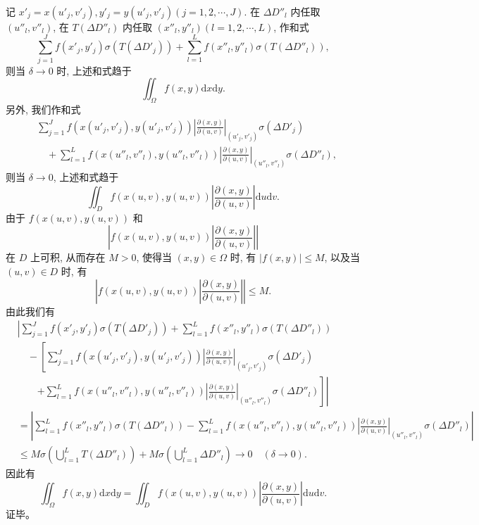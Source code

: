 \documentclass[UTF8, 12pt, fontset=fandol, oneside]{ctexart}
\begin{document}
记 $x'_j=x(u'_j,v'_j), y'_j=y(u'_j,v'_j)(j=1,2,\cdots,J)$. 在 $\Delta D''_l$ 内任取 $(u''_l,v''_l)$, 在 $T(\Delta D''_l)$ 内任取 $(x''_l,y''_l)(l=1,2,\cdots,L)$, 作和式
\begin{equation}
  \sum_{j=1}^J f(x'_j,y'_j)\sigma(T(\Delta D'_j))
  +\sum_{l=1}^L f(x''_l,y''_l)\sigma(T(\Delta D''_l)),
  \tag{15.4.1}
\end{equation}
则当 $\delta\to0$ 时, 上述和式趋于
\[
  \iint_\Omega f(x,y)\mathrm dx\mathrm dy.
\]
另外, 我们作和式
\begin{equation}
\begin{aligned}
  &\sum_{j=1}^J f(x(u'_j,v'_j),y(u'_j,v'_j))
  \left|\frac{\partial(x,y)}{\partial(u,v)}\right|_{(u'_j,v'_j)}
  \sigma(\Delta D'_j)\\
  &\quad+\sum_{l=1}^L f(x(u''_l,v''_l),y(u''_l,v''_l))
  \left|\frac{\partial(x,y)}{\partial(u,v)}\right|_{(u''_l,v''_l)}
  \sigma(\Delta D''_l),
\end{aligned}
  \tag{15.4.2}
\end{equation}
则当 $\delta\to0$, 上述和式趋于
\[
  \iint_D f(x(u,v),y(u,v))
  \left|\frac{\partial(x,y)}{\partial(u,v)}\right|\mathrm du\mathrm dv.
\]
由于 $f(x(u,v),y(u,v))$ 和
\[
  \left|f(x(u,v),y(u,v))\left|\frac{\partial(x,y)}{\partial(u,v)}\right|\right|
\]
在 $D$ 上可积, 从而存在 $M>0$, 使得当 $(x,y)\in\Omega$ 时, 有 $|f(x,y)|\leqslant M$, 以及当 $(u,v)\in D$ 时, 有
\[
  \left|f(x(u,v),y(u,v))\left|\frac{\partial(x,y)}{\partial(u,v)}\right|\right|\leqslant M.
\]
由此我们有
\[
\begin{aligned}
  &\left|
  \sum_{j=1}^J f(x'_j,y'_j)\sigma(T(\Delta D'_j))
  +\sum_{l=1}^L f(x''_l,y''_l)\sigma(T(\Delta D''_l))\right.\\
  &\quad-\left[
  \sum_{j=1}^J f(x(u'_j,v'_j),y(u'_j,v'_j))
  \left|\frac{\partial(x,y)}{\partial(u,v)}\right|_{(u'_j,v'_j)}
  \sigma(\Delta D'_j)\right.\\
  &\qquad\left.\left.
  +\sum_{l=1}^L f(x(u''_l,v''_l),y(u''_l,v''_l))
  \left|\frac{\partial(x,y)}{\partial(u,v)}\right|_{(u''_l,v''_l)}
  \sigma(\Delta D''_l)\right]\right|\\
  &=\left|
  \sum_{l=1}^L f(x''_l,y''_l)\sigma(T(\Delta D''_l))
  -\sum_{l=1}^L f(x(u''_l,v''_l),y(u''_l,v''_l))
  \left|\frac{\partial(x,y)}{\partial(u,v)}\right|_{(u''_l,v''_l)}
  \sigma(\Delta D''_l)\right|\\
  &\leqslant M\sigma\left(\bigcup_{l=1}^L T(\Delta D''_l)\right)
  +M\sigma\left(\bigcup_{l=1}^L\Delta D''_l\right)\to0\quad(\delta\to0).
\end{aligned}
\]
因此有
\[
  \iint_\Omega f(x,y)\mathrm dx\mathrm dy
  =\iint_D f(x(u,v),y(u,v))
  \left|\frac{\partial(x,y)}{\partial(u,v)}\right|\mathrm du\mathrm dv.
\]
证毕。
\end{document}

